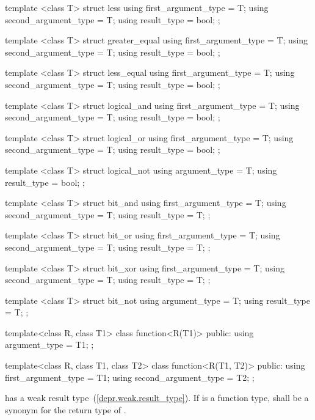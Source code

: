 \begin{codeblock}
{  template <class T> struct less {
    using first_argument_type  = T;
    using second_argument_type = T;
    using result_type          = bool;
  };

  template <class T> struct greater_equal {
    using first_argument_type  = T;
    using second_argument_type = T;
    using result_type          = bool;
  };

  template <class T> struct less_equal {
    using first_argument_type  = T;
    using second_argument_type = T;
    using result_type          = bool;
  };

  template <class T> struct logical_and {
    using first_argument_type  = T;
    using second_argument_type = T;
    using result_type          = bool;
  };

  template <class T> struct logical_or {
    using first_argument_type  = T;
    using second_argument_type = T;
    using result_type          = bool;
  };

  template <class T> struct logical_not {
    using argument_type = T;
    using result_type   = bool;
  };

  template <class T> struct bit_and {
    using first_argument_type  = T;
    using second_argument_type = T;
    using result_type          = T;
  };

  template <class T> struct bit_or {
    using first_argument_type  = T;
    using second_argument_type = T;
    using result_type          = T;
  };

  template <class T> struct bit_xor {
    using first_argument_type  = T;
    using second_argument_type = T;
    using result_type          = T;
  };

  template <class T> struct bit_not {
    using argument_type = T;
    using result_type   = T;
  };

  template<class R, class T1>
  class function<R(T1)> {
  public:
    using argument_type = T1;
  };

  template<class R, class T1, class T2>
  class function<R(T1, T2)> {
  public:
    using first_argument_type  = T1;
    using second_argument_type = T2;
  };
}
\end{codeblock}

\pnum
{} has a weak result type~(\ref{depr.weak.result_type}).
If  is a function type,
 shall be a synonym for the return type of .

